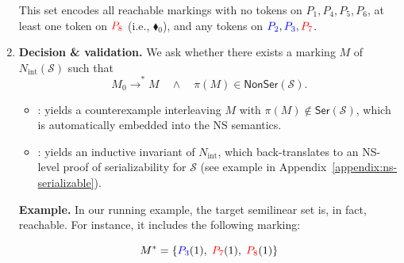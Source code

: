 \begin{enumerate}
\begin{tcolorbox}[colback=black!5!white, colframe=black, boxrule=1pt]
	This set encodes all reachable markings with no tokens on $P_1,P_4,P_5,P_6$, at least one token on $\textcolor{red}{P_8}$ (i.e., {\color{red}$\blacklozenge_0$}), and any tokens on $\textcolor{blue}{P_2},\textcolor{blue}{P_3},\textcolor{red}{P_7}$. 
	\end{tcolorbox} 
	
	
	
	
	\item \textbf{Decision \& validation.}  
	We ask whether there exists a marking \(M\) of \(N_{\mathrm{int}}(\mathcal S)\) such that
	\[
	M_0 \xrightarrow{}^{*} M
	\quad\wedge\quad
	\pi(M)\in \mathsf{NonSer}(\mathcal S).
	\]
	
	\begin{itemize}
		\item [\sat]: yields a counterexample interleaving \(M\) with
		\(\pi(M)\notin \mathsf{Ser}(\mathcal S)\), which is automatically embedded into the NS semantics.
		
		\item [\unsat]: yields an inductive invariant of
		\(N_{\mathrm{int}}\), which back-translates to an NS-level proof of
		serializability 
		for \(\mathcal S\)
(see example in Appendix~\ref{appendix:ns-serializable}).
	\end{itemize}

\begin{tcolorbox}[colback=black!5!white, colframe=black, boxrule=1pt]
	\textbf{Example.}
	In our running example, the target semilinear set is, in fact, reachable. For instance, it includes the following marking:
	
	\[
	M^* = \{\textcolor{blue}{P_3}(1),\;\textcolor{red}{P_7}(1),\;\textcolor{red}{P_8}(1)\}
	\]
	

\end{tcolorbox}
\end{enumerate}
